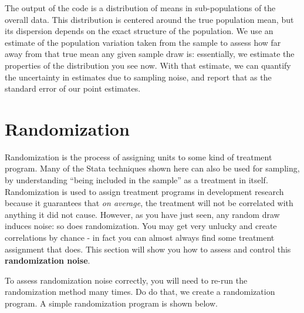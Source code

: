 
The output of the code is a distribution of means in sub-populations of the overall data.
This distribution is centered around the true population mean,
but its dispersion depends on the exact structure of the population.
We use an estimate of the population variation taken from the sample
to assess how far away from that true mean any given sample draw is:
essentially, we estimate the properties of the distribution you see now.
With that estimate, we can quantify the uncertainty in estimates due to sampling noise,
and report that as the standard error of our point estimates.

\section{Randomization}

Randomization is the process of assigning units to some kind of treatment program.
Many of the Stata techniques shown here can also be used for sampling,
by understanding ``being included in the sample'' as a treatment in itself.
Randomization is used to assign treatment programs in development research
because it guarantees that \textit{on average},
the treatment will not be correlated with anything it did not cause.
However, as you have just seen, any random draw induces noise: so does randomization.
You may get very unlucky and create correlations by chance -
in fact you can almost always find some treatment assignment that does.
This section will show you how to assess and control this \textbf{randomization noise}.

To assess randomization noise correctly,
you will need to re-run the randomization method many times.
Do do that, we create a randomization program.
A simple randomization program is shown below.



